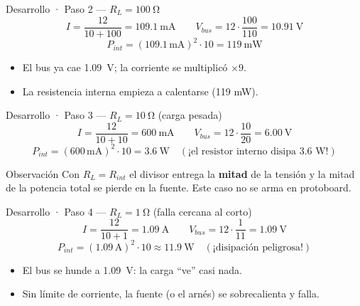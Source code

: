 \documentclass[aspectratio=169]{beamer}
\begin{document}
\begin{frame}{Desarrollo · Paso 2 — $R_L = \SI{100}{\ohm}$}
  \[
    I = \frac{12}{10 + 100} = \SI{109.1}{\milli\ampere}
    \qquad
    V_{bus} = 12\cdot\frac{100}{110} = \SI{10.91}{\volt}
  \]
  \[
    P_{int} = (109.1\,\text{mA})^2\cdot 10 = \SI{119}{\milli\watt}
  \]
  \pause
  \begin{itemize}
    \item El bus ya cae \SI{1.09}{\volt}; la corriente se multiplicó $\times 9$.
    \item La resistencia interna empieza a calentarse (119 mW).
  \end{itemize}
\end{frame}

\begin{frame}{Desarrollo · Paso 3 — $R_L = \SI{10}{\ohm}$ (carga pesada)}
  \[
    I = \frac{12}{10 + 10} = \SI{600}{\milli\ampere}
    \qquad
    V_{bus} = 12\cdot\frac{10}{20} = \SI{6.00}{\volt}
  \]
  \[
    P_{int} = (600\,\text{mA})^2\cdot 10 = \SI{3.6}{\watt} \quad (\text{¡el resistor interno disipa 3.6 W!})
  \]
  \pause
  \begin{alertblock}{Observación}
    Con $R_L = R_{int}$ el divisor entrega la \textbf{mitad} de la tensión y la
    mitad de la potencia total se pierde en la fuente. Este caso no se arma en protoboard.
  \end{alertblock}
\end{frame}

\begin{frame}{Desarrollo · Paso 4 — $R_L = \SI{1}{\ohm}$ (falla cercana al corto)}
  \[
    I = \frac{12}{10 + 1} = \SI{1.09}{\ampere}
    \qquad
    V_{bus} = 12\cdot\frac{1}{11} = \SI{1.09}{\volt}
  \]
  \[
    P_{int} = (1.09\,\text{A})^2\cdot 10 \approx \SI{11.9}{\watt} \quad (\text{¡disipación peligrosa!})
  \]
  \pause
  \begin{itemize}
    \item El bus se hunde a \SI{1.09}{\volt}: la carga ``ve'' casi nada.
    \item Sin límite de corriente, la fuente (o el arnés) se sobrecalienta y falla.
  \end{itemize}
\end{frame}
\end{document}
